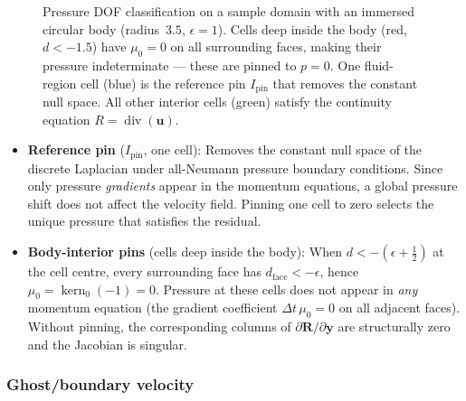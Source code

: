 \documentclass[11pt]{article}
\newcommand{\vect}[1]{\bm{#1}}
\newcommand{\pp}{\partial}
\begin{document}
\begin{figure}[ht]
\caption{Pressure DOF classification on a sample domain with an immersed
  circular body (radius~$3.5$, $\epsilon=1$).
  Cells deep inside the body (\textcolor{red!60!black}{red},
  $d<-1.5$) have $\mu_0=0$ on all surrounding faces, making their
  pressure indeterminate --- these are pinned to $p=0$.
  One fluid-region cell (\textcolor{blue!70!black}{blue}) is the
  reference pin $I_{\mathrm{pin}}$ that removes the constant null space.
  All other interior cells (\textcolor{green!50!black}{green}) satisfy
  the continuity equation $R = \operatorname{div}(\vect{u})$.}
\label{fig:pinning}
\end{figure}

\begin{itemize}
  \item \textbf{Reference pin} ($I_{\mathrm{pin}}$, one cell):
    Removes the constant null space of the discrete Laplacian under
    all-Neumann pressure boundary conditions.  Since only pressure
    \emph{gradients} appear in the momentum equations, a global
    pressure shift does not affect the velocity field.  Pinning one
    cell to zero selects the unique pressure that satisfies the
    residual.

  \item \textbf{Body-interior pins} (cells deep inside the body):
    When $d < -(\epsilon+\frac{1}{2})$ at the cell centre, every
    surrounding face has $d_{\mathrm{face}} < -\epsilon$, hence
    $\mu_0 = \operatorname{kern}_0(-1) = 0$.  Pressure at these cells
    does not appear in \emph{any} momentum equation (the gradient
    coefficient $\Delta t\,\mu_0 = 0$ on all adjacent faces).
    Without pinning, the corresponding columns of
    $\pp\vect{R}/\pp\vect{y}$ are structurally zero and the Jacobian
    is singular.
\end{itemize}

\subsubsection{Ghost/boundary velocity}
\end{document}
